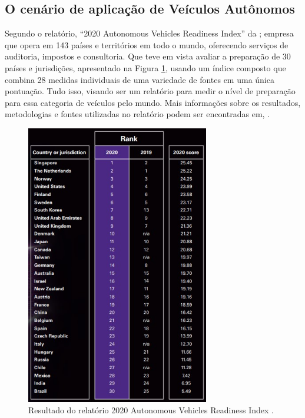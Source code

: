 \subsection{O cenário de aplicação de Veículos Autônomos}
Segundo o relatório, “2020 Autonomous Vehicles Readiness Index” da \cite{KPMG}; empresa que opera em 143 países e territórios em todo o mundo, oferecendo serviços de auditoria, impostos e consultoria.
Que teve em vista avaliar a preparação de 30 países e jurisdições, apresentado na Figura \ref{KPMG}, usando um índice composto que combina 28 medidas individuais de uma variedade de fontes em uma única pontuação. Tudo isso, visando ser um relatório para medir o nível de preparação para essa categoria de veículos pelo mundo. Mais informações sobre os resultados, metodologias e fontes utilizadas no relatório podem ser encontradas em, \cite{KPMG}.
\begin{figure}[H]
\centering
\includegraphics[width=8cm]{Figures/rank.jpg}
\caption{Resultado do relatório 2020 Autonomous Vehicles Readiness Index \cite{KPMG}.}
\label{KPMG}
\end{figure}

